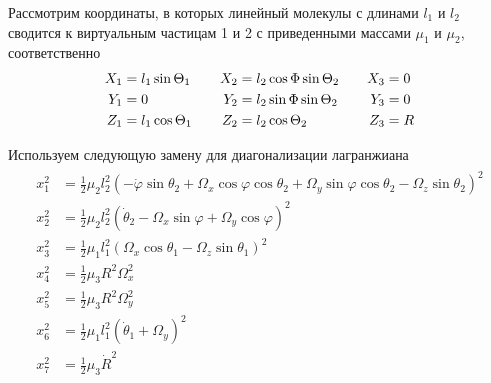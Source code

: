 \documentclass[12pt]{article}
\newcommand{\lb}{\left(}
\newcommand{\rb}{\right)}
\begin{document}
Рассмотрим координаты, в которых линейный молекулы с длинами $l_1$ и $l_2$ сводится к виртуальным частицам 1 и 2 с приведенными массами $\mu_1$ и $\mu_2$, соответственно 
\begin{gather}
	\begin{aligned}
		X_1 &= l_1 \sin \Theta_1 \\
		Y_1 &= 0 \\
		Z_1 &= l_1 \cos \Theta_1
	\end{aligned}
	\quad \quad
	\begin{aligned}
		X_2 &= l_2 \cos \Phi \sin \Theta_2 \\
		Y_2 &= l_2 \sin \Phi \sin \Theta_2 \\
		Z_2 &= l_2 \cos \Theta_2
	\end{aligned}
	\quad \quad
	\begin{aligned}
		X_3 &= 0 \\
		Y_3 &= 0 \\
		Z_3 &= R
	\end{aligned} \notag
\end{gather}

Используем следующую замену для диагонализации лагранжиана
\begin{gather}
	\begin{aligned}
			x_1^2 &= \frac{1}{2} \mu_2 l_2^2 \lb - \dot{\varphi} \sin \theta_2 + \Omega_x \cos \varphi \cos \theta_2 + \Omega_y \sin \varphi \cos \theta_2 - \Omega_z \sin \theta_2 \rb^2 \\
			x_2^2 &= \frac{1}{2} \mu_2 l_2^2 \lb \dot{\theta}_2 - \Omega_x \sin \varphi + \Omega_y \cos \varphi \rb^2 \\
			x_3^2 &= \frac{1}{2} \mu_1 l_1^2 \lb \Omega_x \cos \theta_1 - \Omega_z \sin \theta_1 \rb^2 \\
			x_4^2 &= \frac{1}{2} \mu_3 R^2 \Omega_x^2 \\
			x_5^2 &= \frac{1}{2} \mu_3 R^2 \Omega_y^2 \\
			x_6^2 &= \frac{1}{2} \mu_1 l_1^2 \lb \dot{\theta}_1  + \Omega_y \rb^2 \\
			x_7^2 &= \frac{1}{2} \mu_3 \dot{R}^2 
	\end{aligned} \label{n2n2_1}
\end{gather}
\end{document}
